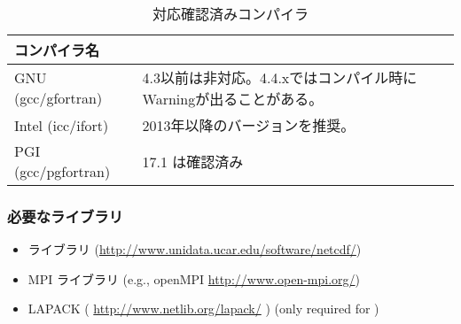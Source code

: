 

\begin{table}[htb]
\begin{center}
\caption{対応確認済みコンパイラ}
\begin{tabularx}{150mm}{|l|X|X|} \hline
 \rowcolor[gray]{0.9} コンパイラ名 & \\ \hline
 GNU (gcc/gfortran)    & 4.3以前は非対応。4.4.xではコンパイル時にWarningが出ることがある。 \\ \hline
 Intel (icc/ifort)     & 2013年以降のバージョンを推奨。 \\ \hline
 PGI (gcc/pgfortran)   & 17.1 は確認済み              \\ \hline
\end{tabularx}
\label{tab:compatible_compiler}
\end{center}
\end{table}

\subsubsection{\bf 必要なライブラリ}\label{sec:inst_env}
  \begin{itemize}
   \item {\netcdf} ライブラリ (\url{http://www.unidata.ucar.edu/software/netcdf/})
   \item MPI ライブラリ (e.g., openMPI \url{http://www.open-mpi.org/})
   \item LAPACK ( \url{http://www.netlib.org/lapack/} ) (only required for \scalegm)
  \end{itemize}
  
